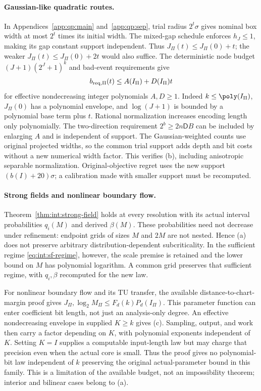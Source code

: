 \paragraph{Gaussian-like quadratic routes.}
In Appendices~\ref{app:qp:main} and~\ref{app:qp:sep}, trial radius
$2^t\sigma$ gives nominal box width at most $2^t$ times its initial
width. The mixed-gap schedule enforces $h_J\le1$, making its gap
constant support independent. Thus $J_\Pi(t)\le J_\Pi(0)+t$; the
weaker $J_\Pi(t)\le J_\Pi(0)+2t$ would also suffice. The deterministic
node budget $(J+1)(2^J+1)^k$ and bad-event requirements give
\[
 b_{\rm req,\Pi}(t)\le A(I_\Pi)+D(I_\Pi)t
\]
for effective nondecreasing integer polynomials $A,D\ge1$. Indeed
$k\le\poly(I_\Pi)$, $J_\Pi(0)$ has a polynomial envelope, and
$\log(J+1)$ is bounded by a polynomial base term plus $t$. Rational
normalization increases encoding length only polynomially. The
two-direction requirement $2^b\ge2n\mathsf DB$ can be included by
enlarging $A$ and is independent of support. The Gaussian-weighted
counts use original projected widths, so the common trial support adds
depth and bit costs without a new numerical width factor. This verifies
(b), including anisotropic separable normalization. Original-objective
regret uses the new support $(b(I)+20)\sigma$; a calibration made with
smaller support must be recomputed.

\paragraph{Strong fields and nonlinear boundary flow.}
Theorem~\ref{thm:int:strong-field} holds at every resolution with its
actual interval probabilities $q_i(M)$ and derived $\beta(M)$. These
probabilities need not decrease under refinement: endpoint grids of
sizes $M$ and $2M$ are not nested. Hence (a) does not preserve arbitrary
distribution-dependent subcriticality. In the sufficient regime
\eqref{eq:int:sf-regime}, however, the scale premise is retained and
the lower bound on $M$ has polynomial logarithm. A common grid preserves
that sufficient regime, with $q_i,\beta$ recomputed for the new law.

For nonlinear boundary flow and its TU transfer, the available
distance-to-chart-margin proof gives
$J_\Pi,\log_2M_\Pi\le F_d(k)P_d(I_\Pi)$. This parameter function
can enter coefficient bit length, not just an analysis-only degree.
An effective nondecreasing envelope in supplied $K\ge k$ gives (c).
Sampling, output, and work then carry a factor depending on $K$, with
polynomial exponents independent of $K$. Setting $K=I$ supplies a
computable input-length law but may charge that precision even when the
actual core is small. Thus the proof gives no polynomial-bit law
independent of $k$ preserving the original actual-parameter bound in
this family. This is a limitation of the available budget, not an
impossibility theorem; interior and bilinear cases belong to (a).

